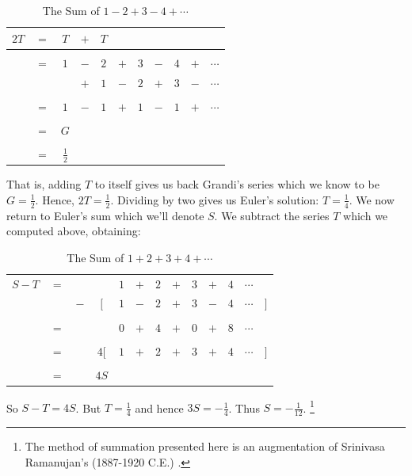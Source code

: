 \begin{example}
        \begin{table}[H]
            \centering
            \captionsetup{type=table}
            \begin{tabular}{ccccccccccc}
                $2T$&$=$&$T$&$+$&$T$\\
                    \hline\\
                    &$=$&$1$&$-$&$2$&$+$&$3$&$-$&$4$&$+$&$\cdots$\\
                    &   &   &$+$&$1$&$-$&$2$&$+$&$3$&$-$&$\cdots$\\
                \hline\\
                    &$=$&$1$&$-$&$1$&$+$&$1$&$-$&$1$&$+$&$\cdots$\\
                \hline\\
                &$=$&$G$\\
                \hline\\
                &$=$&$\frac{1}{2}$
            \end{tabular}
            \caption{The Sum of $1-2+3-4+\cdots$}
        \end{table}
        That is, adding $T$ to itself gives us back Grandi's series which we
        know to be $G=\frac{1}{2}$. Hence, $2T=\frac{1}{2}$. Dividing by two
        gives us Euler's solution: $T=\frac{1}{4}$. We now return to Euler's sum
        which we'll denote $S$. We subtract the series $T$ which we computed
        above, obtaining:
        \begin{table}[H]
            \centering
            \captionsetup{type=table}
            \begin{tabular}{ccccccccccccc}
                $S-T$&$=$&&       &$1$&$+$&$2$&$+$&$3$&$+$&$4$&$\cdots$\\
                     &&$-$&$\Big[$&$1$&$-$&$2$&$+$&$3$&$-$&$4$&$\cdots$&$\Big]$
                \\[1ex]
                \hline\\
                     &$=$&&&$0$&$+$&$4$&$+$&$0$&$+$&$8$&$\cdots$\\[1ex]
                \hline\\
                &$=$&&$4\Big[$&$1$&$+$&$2$&$+$&$3$&$+$&$4$&$\cdots$&$\Big]$
                    \\[1ex]
                \hline\\
                &$=$&&$4S$
            \end{tabular}
            \caption{The Sum of $1+2+3+4+\cdots$}
        \end{table}
        So $S-T=4S$. But $T=\frac{1}{4}$ and hence $3S=\minus\frac{1}{4}$.
        Thus $S=\minus\frac{1}{12}$.%
        \footnote{%
            The method of summation presented here is an augmentation of
            Srinivasa Ramanujan's (1887-1920 C.E.)
            \cite[Chapt.~VIII p.~3]{RamanujanNotebooksI}.
        }
    \end{example}
